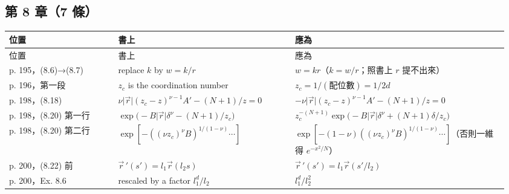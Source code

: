 \subsection{第 8 章（7 條）}
{\footnotesize\renewcommand{\arraystretch}{1.1}\setlength{\tabcolsep}{4pt}
\begin{longtable}{@{}>{\raggedright\arraybackslash}p{0.21\linewidth}>{\raggedright\arraybackslash}p{0.34\linewidth}>{\raggedright\arraybackslash}p{0.41\linewidth}@{}}
\toprule 位置 & 書上 & 應為\\ \midrule\endfirsthead
\toprule 位置 & 書上 & 應為\\ \midrule\endhead
\bottomrule\endfoot
p. 195，(8.6)→(8.7) & replace $k$ by $w=k/r$ & $w=kr$（$k=w/r$；照書上 $r$ 提不出來）\\
p. 196，第一段 & $z_c$ is the coordination number & $z_c=1/(\text{配位數})=1/2d$\\
p. 198，(8.18) & $\nu\lvert\vec r\rvert(z_c-z)^{\nu-1}A'-(N+1)/z=0$ & $-\nu\lvert\vec r\rvert(z_c-z)^{\nu-1}A'-(N+1)/z=0$\\
p. 198，(8.20) 第一行 & $\exp\big(-B\lvert\vec r\rvert\delta^\nu-(N+1)/z_c\big)$ & $z_c^{-(N+1)}\exp\big(-B\lvert\vec r\rvert\delta^\nu+(N+1)\delta/z_c\big)$\\
p. 198，(8.20) 第二行 & $\exp[-((\nu z_c)^\nu B)^{1/(1-\nu)}\cdots]$ & $\exp[-(1-\nu)((\nu z_c)^\nu B)^{1/(1-\nu)}\cdots]$（否則一維得 $e^{-x^2/N}$）\\
p. 200，(8.22) 前 & $\vec r\,'(s')=l_1\vec r(l_2s)$ & $\vec r\,'(s')=l_1\vec r(s'/l_2)$\\
p. 200，Ex. 8.6 & rescaled by a factor $l_1^d/l_2$ & $l_1^d/l_2^2$\\
\end{longtable}}

